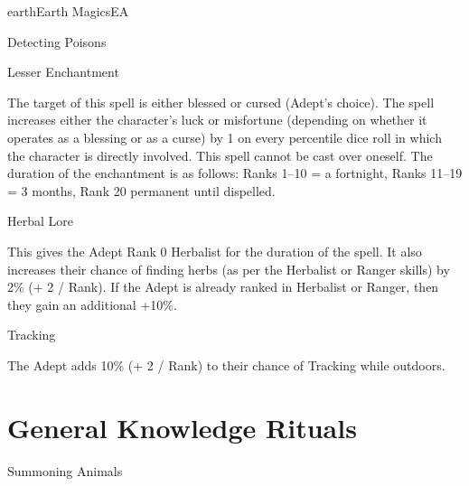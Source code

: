 \begin{College}[1.2]{earth}{Earth Magics}{EA}
\begin{spell}[G-8]{Detecting Poisons}
\begin{effects}
\end{effects}
\end{spell}

\begin{spell}[G-9]{Lesser Enchantment}

\begin{effects}
The target of this spell is either blessed or cursed (Adept’s choice).
The spell increases either the character’s luck or misfortune
(depending on whether it operates as a blessing or as a curse) by 1 on
every percentile dice roll in which the character is directly
involved.  This spell cannot be cast over oneself.  The duration of
the enchantment is as follows: Ranks 1–10 = a fortnight, Ranks 11–19 =
3 months, Rank 20 permanent until dispelled.
\end{effects}
\end{spell}

\begin{spell}[G-10]{Herbal Lore}

\begin{effects}
This gives the Adept Rank 0 Herbalist for the duration of the spell.
It also increases their chance of finding herbs (as per the Herbalist
or Ranger skills) by 2\% (+ 2 / Rank). If the Adept is already ranked
in Herbalist or Ranger, then they gain an additional +10\%.
\end{effects}
\end{spell}

\begin{spell}[G-11]{Tracking}

\begin{effects}
The Adept adds 10\% (+ 2 / Rank) to their chance of Tracking while outdoors.
\end{effects}
\end{spell}

\section{General Knowledge Rituals}

\begin{ritual}[Q-1]{Summoning Animals}


\end{ritual}
\end{College}

